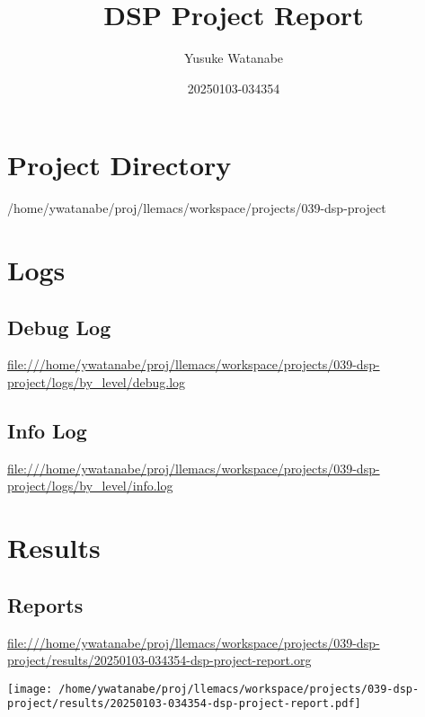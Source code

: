 \documentclass[11pt]{article}
\author{Yusuke Watanabe}
\date{20250103-034354}
\title{DSP Project Report}
\begin{document}
\maketitle
\tableofcontents


\section{Project Directory}
\label{sec:orgf46c849}
/home/ywatanabe/proj/llemacs/workspace/projects/039-dsp-project

\section{Logs}
\label{sec:orgf314726}
\subsection{Debug Log}
\label{sec:orgc4038b4}
\url{file:///home/ywatanabe/proj/llemacs/workspace/projects/039-dsp-project/logs/by\_level/debug.log}

\subsection{Info Log}
\label{sec:org4067e50}
\url{file:///home/ywatanabe/proj/llemacs/workspace/projects/039-dsp-project/logs/by\_level/info.log}

\section{Results}
\label{sec:org0e236e9}
\subsection{Reports}
\label{sec:org448cda0}
\url{file:///home/ywatanabe/proj/llemacs/workspace/projects/039-dsp-project/results/20250103-034354-dsp-project-report.org}

\begin{center}
\texttt{[image: /home/ywatanabe/proj/llemacs/workspace/projects/039-dsp-project/results/20250103-034354-dsp-project-report.pdf]}
\end{center}
\end{document}
